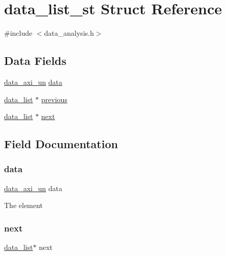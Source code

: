 \hypertarget{structdata__list__st}{}\section{data\+\_\+list\+\_\+st Struct Reference}
\label{structdata__list__st}


{\ttfamily \#include $<$data\+\_\+analysis.\+h$>$}

\subsection*{Data Fields}
\begin{DoxyCompactItemize}
\item 
\mbox{\hyperlink{data__analysis_8h_ad74545be5b70493f9d9bea54ea709e0a}{data\+\_\+axi\+\_\+un}} \mbox{\hyperlink{structdata__list__st_a3bec3a8b685ca74b96218b5826f55fc6}{data}}
\item 
\mbox{\hyperlink{data__analysis_8h_a9db432fc1185a85fe322653c4d3f54d5}{data\+\_\+list}} $\ast$ \mbox{\hyperlink{structdata__list__st_a23f1012db1e6eb88a69e28cf0b419422}{previous}}
\item 
\mbox{\hyperlink{data__analysis_8h_a9db432fc1185a85fe322653c4d3f54d5}{data\+\_\+list}} $\ast$ \mbox{\hyperlink{structdata__list__st_aeae23435d8356eb827211e1514b9cec3}{next}}
\end{DoxyCompactItemize}


\subsection{Field Documentation}
\mbox{\label{structdata__list__st_a3bec3a8b685ca74b96218b5826f55fc6}} 
\subsubsection{\texorpdfstring{data}{data}}
{\footnotesize\ttfamily \mbox{\hyperlink{data__analysis_8h_ad74545be5b70493f9d9bea54ea709e0a}{data\+\_\+axi\+\_\+un}} data}

The element \mbox{\label{structdata__list__st_aeae23435d8356eb827211e1514b9cec3}} 
\subsubsection{\texorpdfstring{next}{next}}
{\footnotesize\ttfamily \mbox{\hyperlink{data__analysis_8h_a9db432fc1185a85fe322653c4d3f54d5}{data\+\_\+list}}$\ast$ next}

